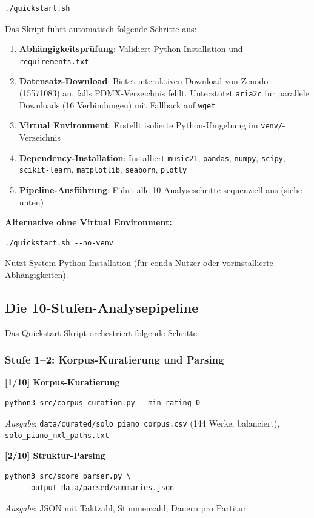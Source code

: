 \documentclass[12pt,a4paper]{article}
\theoremstyle{definition}
\begin{document}
\begin{lstlisting}
./quickstart.sh
\end{lstlisting}

Das Skript führt automatisch folgende Schritte aus:
\begin{enumerate}
    \item \textbf{Abhängigkeitsprüfung}: Validiert Python-Installation und \texttt{requirements.txt}
    \item \textbf{Datensatz-Download}: Bietet interaktiven Download von Zenodo (15571083) an, falls PDMX-Verzeichnis fehlt. Unterstützt \texttt{aria2c} für parallele Downloads (16 Verbindungen) mit Fallback auf \texttt{wget}
    \item \textbf{Virtual Environment}: Erstellt isolierte Python-Umgebung im \texttt{venv/}-Verzeichnis
    \item \textbf{Dependency-Installation}: Installiert \texttt{music21}, \texttt{pandas}, \texttt{numpy}, \texttt{scipy}, \texttt{scikit-learn}, \texttt{matplotlib}, \texttt{seaborn}, \texttt{plotly}
    \item \textbf{Pipeline-Ausführung}: Führt alle 10 Analyseschritte sequenziell aus (siehe unten)
\end{enumerate}

\textbf{Alternative ohne Virtual Environment:}
\begin{lstlisting}
./quickstart.sh --no-venv
\end{lstlisting}
Nutzt System-Python-Installation (für conda-Nutzer oder vorinstallierte Abhängigkeiten).

\subsection{Die 10-Stufen-Analysepipeline}

Das Quickstart-Skript orchestriert folgende Schritte:

\subsubsection{Stufe 1--2: Korpus-Kuratierung und Parsing}

\textbf{[1/10] Korpus-Kuratierung}
\begin{lstlisting}
python3 src/corpus_curation.py --min-rating 0
\end{lstlisting}
\textit{Ausgabe}: \texttt{data/curated/solo\_piano\_corpus.csv} (144 Werke, balanciert), \texttt{solo\_piano\_mxl\_paths.txt}

\textbf{[2/10] Struktur-Parsing}
\begin{lstlisting}
python3 src/score_parser.py \
    --output data/parsed/summaries.json
\end{lstlisting}
\textit{Ausgabe}: JSON mit Taktzahl, Stimmenzahl, Dauern pro Partitur
\end{document}
